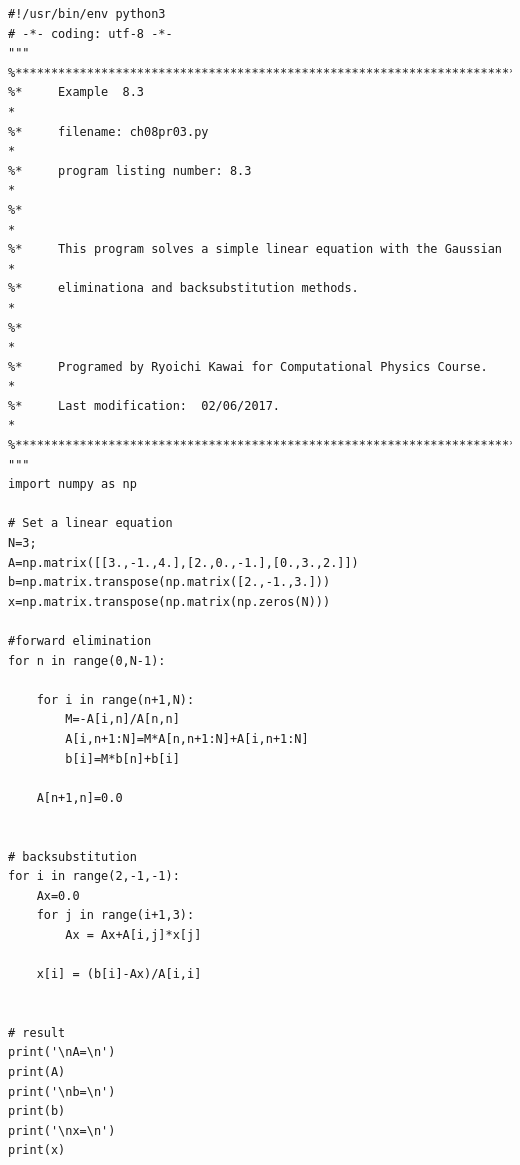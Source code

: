 
\bigskip
\noindent
\program
\footnotesize
\begin{verbatim}
#!/usr/bin/env python3
# -*- coding: utf-8 -*-
"""
%**************************************************************************
%*     Example  8.3                                                       *
%*     filename: ch08pr03.py                                              *
%*     program listing number: 8.3                                        *
%*                                                                        *
%*     This program solves a simple linear equation with the Gaussian     *
%*     eliminationa and backsubstitution methods.                         *
%*                                                                        *
%*     Programed by Ryoichi Kawai for Computational Physics Course.       *
%*     Last modification:  02/06/2017.                                    *
%**************************************************************************
"""
import numpy as np

# Set a linear equation
N=3;
A=np.matrix([[3.,-1.,4.],[2.,0.,-1.],[0.,3.,2.]])
b=np.matrix.transpose(np.matrix([2.,-1.,3.]))
x=np.matrix.transpose(np.matrix(np.zeros(N)))

#forward elimination
for n in range(0,N-1):
  
    for i in range(n+1,N):
        M=-A[i,n]/A[n,n]
        A[i,n+1:N]=M*A[n,n+1:N]+A[i,n+1:N]
        b[i]=M*b[n]+b[i]

    A[n+1,n]=0.0 


# backsubstitution
for i in range(2,-1,-1):
    Ax=0.0
    for j in range(i+1,3):
        Ax = Ax+A[i,j]*x[j]

    x[i] = (b[i]-Ax)/A[i,i]


# result
print('\nA=\n')
print(A)
print('\nb=\n')
print(b)
print('\nx=\n')
print(x)
\end{verbatim}


